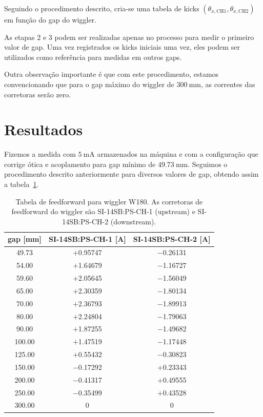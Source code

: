 \documentclass[a4paper,
               keeplastbox,   %
               ]{jacow}
\begin{document}
Seguindo o procedimento descrito, cria-se uma tabela de kicks $\left(\theta_{x, \mathrm{CH1}},\theta_{x, \mathrm{CH2}}\right)$ em função do gap do wiggler.

As etapas 2 e 3 podem ser realizadas apenas no processo para medir o primeiro valor de gap. Uma vez registrados os kicks iniciais uma vez, eles podem ser utilizados como referência para medidas em outros gaps. 

Outra observação importante é que com este procedimento, estamos convencionando que para o gap máximo do wiggler de $\SI{300}{\milli\meter}$, as correntes das corretoras serão zero.

\section{Resultados}
Fizemos a medida com $\SI{5}{\milli\ampere}$ armazenados na máquina e com a configuração que corrige ótica e acoplamento para gap mínimo de $\SI{49.73}{\milli\meter}$. Seguimos o procedimento descrito anteriormente para diversos valores de gap, obtendo assim a tabela~\ref{tab:ffwd_table}.

\begin{table}[!h]
\caption{Tabela de feedforward para wiggler W180. As corretoras de feedforward do wiggler são SI-14SB:PS-CH-1 (upstream) e SI-14SB:PS-CH-2 (downstream).}
\centering
\begin{tabular}{ccc}
\hline
\hline
gap {[}mm{]} & SI-14SB:PS-CH-1 {[}A{]} & SI-14SB:PS-CH-2 {[}A{]} \\
\hline
49.73                & $+$0.95747           & $-$0.26131           \\
54.00                & $+$1.64679           & $-$1.16727           \\
59.60                & $+$2.05645           & $-$1.56049           \\
65.00                & $+$2.30359           & $-$1.80134           \\
70.00                & $+$2.36793           & $-$1.89913           \\
80.00                & $+$2.24804           & $-$1.79063           \\
90.00                & $+$1.87255           & $-$1.49682           \\
100.00               & $+$1.47519           & $-$1.17448           \\
125.00               & $+$0.55432           & $-$0.30823           \\
150.00               & $-$0.17292           & $+$0.23343           \\
200.00               & $-$0.41317           & $+$0.49555           \\
250.00               & $-$0.35499           & $+$0.43528           \\
300.00               & 0           & 0           \\
\hline
\hline
\end{tabular}
\label{tab:ffwd_table}
\end{table}
\end{document}
